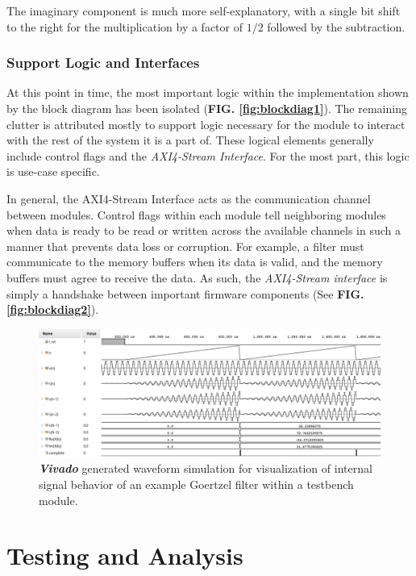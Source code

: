 \documentclass[reprint,amsmath,amssymb,aps,pra]{revtex4-2}
\begin{document}
The imaginary component is much more self-explanatory, with a single bit shift to the right for the multiplication by a factor of $1/2$ followed by the subtraction.

\subsubsection{Support Logic and Interfaces}

At this point in time, the most important logic within the implementation shown by the block diagram has been isolated (\textbf{FIG. \ref{fig:blockdiag1}}). The remaining clutter is attributed mostly to support logic necessary for the module to interact with the rest of the system it is a part of. These logical elements generally include control flags and the \textit{AXI4-Stream Interface}. For the most part, this logic is use-case specific.

In general, the AXI4-Stream Interface acts as the communication channel between modules. Control flags within each module tell neighboring modules when data is ready to be read or written across the available channels in such a manner that prevents data loss or corruption. For example, a filter must communicate to the memory buffers when its data is valid, and the memory buffers must agree to receive the data. As such, the \textit{AXI4-Stream interface} is simply a handshake between important firmware components (See \textbf{FIG. \ref{fig:blockdiag2}}).

\begin{figure}[t!]
    \centering
    \includegraphics[width=\linewidth]{figs/goertzel_waveform0_inv.png}
    \caption{\textit{\textbf{Vivado}} generated waveform simulation for visualization of internal signal behavior of an example Goertzel filter within a testbench module.}
    \label{fig:vivadowf}
\end{figure}

\section{Testing and Analysis}
\end{document}
